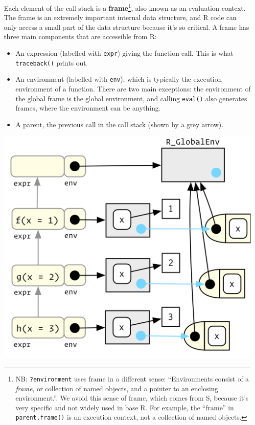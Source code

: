 \documentclass[]{book}
\let\rmarkdownfootnote\footnote%
\def\footnote{\protect\rmarkdownfootnote}
\theoremstyle{definition}
\theoremstyle{definition}
\theoremstyle{definition}
\theoremstyle{remark}
\begin{document}
Each element of the call stack is a \textbf{frame}\footnote{NB:
  \texttt{?environment} uses frame in a different sense: ``Environments
  consist of a \emph{frame}, or collection of named objects, and a
  pointer to an enclosing environment.''. We avoid this sense of frame,
  which comes from S, because it's very specific and not widely used in
  base R. For example, the ``frame'' in \texttt{parent.frame()} is an
  execution context, not a collection of named objects.}, also known as
an evaluation context. The frame is an extremely important internal data
structure, and R code can only access a small part of the data structure
because it's so critical. A frame has three main components that are
accessible from R:

\begin{itemize}
\item
  An expression (labelled with \texttt{expr}) giving the function call.
  This is what \texttt{traceback()} prints out.
\item
  An environment (labelled with \texttt{env}), which is typically the
  execution environment of a function. There are two main exceptions:
  the environment of the global frame is the global environment, and
  calling \texttt{eval()} also generates frames, where the environment
  can be anything.
\item
  A parent, the previous call in the call stack (shown by a grey arrow).
\end{itemize}

\begin{center}\includegraphics{diagrams/environments/calling} \end{center}
\end{document}
